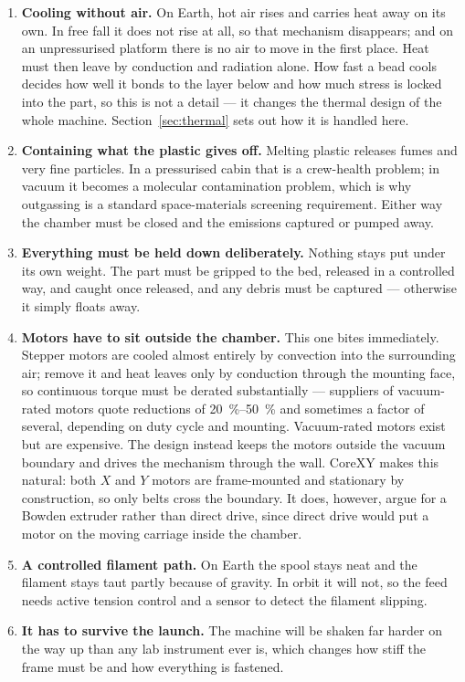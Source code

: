 \documentclass[11pt,a4paper]{article}
\begin{document}
\begin{enumerate}[leftmargin=*]
  \item \textbf{Cooling without air.} On Earth, hot air rises and carries heat
        away on its own. In free fall it does not rise at all, so that mechanism
        disappears; and on an unpressurised platform there is no air to move in
        the first place. Heat must then leave by conduction and radiation alone.
        How fast a bead cools decides how well it bonds to the layer below and
        how much stress is locked into the part, so this is not a detail --- it
        changes the thermal design of the whole machine. Section~\ref{sec:thermal}
        sets out how it is handled here.
  \item \textbf{Containing what the plastic gives off.} Melting plastic releases
        fumes and very fine particles. In a pressurised cabin that is a
        crew-health problem; in vacuum it becomes a molecular contamination
        problem, which is why outgassing is a standard space-materials screening
        requirement. Either way the chamber must be closed and the emissions
        captured or pumped away.
  \item \textbf{Everything must be held down deliberately.} Nothing stays put
        under its own weight. The part must be gripped to the bed, released in a
        controlled way, and caught once released, and any debris must be
        captured --- otherwise it simply floats away.
  \item \textbf{Motors have to sit outside the chamber.} This one bites
        immediately. Stepper motors are cooled almost entirely by convection
        into the surrounding air; remove it and heat leaves only by conduction
        through the mounting face, so continuous torque must be derated
        substantially --- suppliers of vacuum-rated motors quote reductions of
        \SIrange{20}{50}{\percent} and sometimes a factor of several, depending
        on duty cycle and mounting. Vacuum-rated motors exist but are expensive.
        The design instead keeps the motors outside the vacuum boundary and
        drives the mechanism through the wall. CoreXY makes this natural: both
        \(X\) and \(Y\) motors are frame-mounted and stationary by construction,
        so only belts cross the boundary. It does, however, argue for a Bowden
        extruder rather than direct drive, since direct drive would put a motor
        on the moving carriage inside the chamber.
  \item \textbf{A controlled filament path.} On Earth the spool stays neat and
        the filament stays taut partly because of gravity. In orbit it will not,
        so the feed needs active tension control and a sensor to detect the
        filament slipping.
  \item \textbf{It has to survive the launch.} The machine will be shaken far
        harder on the way up than any lab instrument ever is, which changes how
        stiff the frame must be and how everything is fastened.
\end{enumerate}
\end{document}
